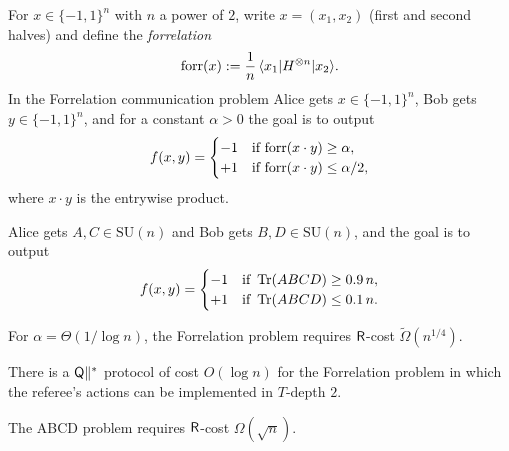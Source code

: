 \begin{definition}
  \label{def:forrelation}
  For $x\in\{-1,1\}^n$ with $n$ a power of $2$, write $x = (x_1, x_2)$ (first and
  second halves) and define the \emph{forrelation}
  \[
    \mathrm{forr}(x) := \frac{1}{n}\,\langle x_1\rvert H^{\otimes n}\lvert x_2\rangle.
  \]
  In the Forrelation communication problem Alice gets $x\in\{-1,1\}^n$, Bob gets
  $y\in\{-1,1\}^n$, and for a constant $\alpha>0$ the goal is to output
  \[
    f(x,y) = \begin{cases} -1 & \text{if } \mathrm{forr}(x\cdot y) \ge \alpha, \\
      +1 & \text{if } \mathrm{forr}(x\cdot y) \le \alpha/2, \end{cases}
  \]
  where $x\cdot y$ is the entrywise product.
\end{definition}

\begin{definition}
  \label{def:abcd}
  Alice gets $A,C\in\mathrm{SU}(n)$ and Bob gets $B,D\in\mathrm{SU}(n)$, and the
  goal is to output
  \[
    f(x,y) = \begin{cases} -1 & \text{if } \operatorname{Tr}(ABCD) \ge 0.9\,n, \\
      +1 & \text{if } \operatorname{Tr}(ABCD) \le 0.1\,n. \end{cases}
  \]
\end{definition}

\begin{lemma}
  \label{lem:forr-r-lb}
  \notready
  For $\alpha = \Theta(1/\log n)$, the Forrelation problem requires
  $\mathsf{R}$-cost $\tilde\Omega(n^{1/4})$.
\end{lemma}

\begin{construction}
  \label{constr:forr-protocol}
  \notready
  There is a $\mathsf{Q}\|^{*}$ protocol of cost $O(\log n)$ for the Forrelation problem in
  which the referee's actions can be implemented in $T$-depth $2$.
\end{construction}

\begin{lemma}
  \label{lem:abcd-r-lb}
  \notready
  The ABCD problem requires $\mathsf{R}$-cost $\Omega(\sqrt{n})$.
\end{lemma}


